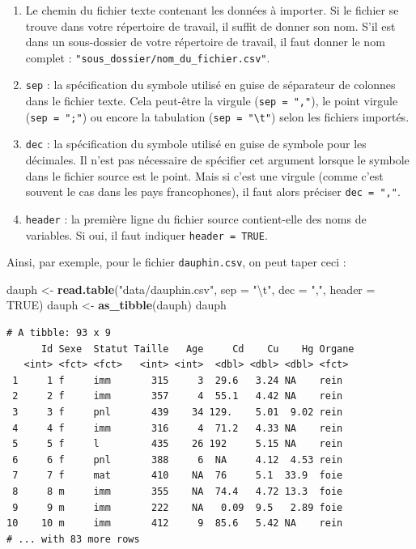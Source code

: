 \documentclass[a4paperpaper,]{article}
\newenvironment{Shaded}{\begin{snugshade}}{\end{snugshade}}
\newcommand{\CharTok}[1]{\textcolor[rgb]{0.57,0.30,0.62}{#1}}
\newcommand{\DataTypeTok}[1]{\textcolor[rgb]{0.00,0.34,0.68}{#1}}
\newcommand{\KeywordTok}[1]{\textcolor[rgb]{0.12,0.11,0.11}{\textbf{#1}}}
\newcommand{\NormalTok}[1]{\textcolor[rgb]{0.12,0.11,0.11}{#1}}
\newcommand{\OtherTok}[1]{\textcolor[rgb]{0.00,0.43,0.16}{#1}}
\newcommand{\StringTok}[1]{\textcolor[rgb]{0.75,0.01,0.01}{#1}}
\providecommand{\tightlist}{%
  \setlength{\itemsep}{0pt}\setlength{\parskip}{0pt}}
\begin{document}
\begin{enumerate}
\def\labelenumi{\arabic{enumi}.}
\tightlist
\item
  Le chemin du fichier texte contenant les données à importer. Si le fichier se trouve dans votre répertoire de travail, il suffit de donner son nom. S'il est dans un sous-dossier de votre répertoire de travail, il faut donner le nom complet : \texttt{"sous\_dossier/nom\_du\_fichier.csv"}.
\item
  \texttt{sep} : la spécification du symbole utilisé en guise de séparateur de colonnes dans le fichier texte. Cela peut-être la virgule (\texttt{sep\ =\ ","}), le point virgule (\texttt{sep\ =\ ";"}) ou encore la tabulation (\texttt{sep\ =\ "\textbackslash{}t"}) selon les fichiers importés.
\item
  \texttt{dec} : la spécification du symbole utilisé en guise de symbole pour les décimales. Il n'est pas nécessaire de spécifier cet argument lorsque le symbole dans le fichier source est le point. Mais si c'est une virgule (comme c'est souvent le cas dans les pays francophones), il faut alors préciser \texttt{dec\ =\ ","}.
\item
  \texttt{header} : la première ligne du fichier source contient-elle des noms de variables. Si oui, il faut indiquer \texttt{header\ =\ TRUE}.
\end{enumerate}

Ainsi, par exemple, pour le fichier \texttt{dauphin.csv}, on peut taper ceci :

\begin{Shaded}
\begin{Highlighting}[]
\NormalTok{dauph <-}\StringTok{ }\KeywordTok{read.table}\NormalTok{(}\StringTok{"data/dauphin.csv"}\NormalTok{, }\DataTypeTok{sep =} \StringTok{"}\CharTok{\textbackslash{}t}\StringTok{"}\NormalTok{, }\DataTypeTok{dec =} \StringTok{","}\NormalTok{, }\DataTypeTok{header =} \OtherTok{TRUE}\NormalTok{)}
\NormalTok{dauph <-}\StringTok{ }\KeywordTok{as_tibble}\NormalTok{(dauph)}
\NormalTok{dauph}
\end{Highlighting}
\end{Shaded}

\begin{verbatim}
# A tibble: 93 x 9
      Id Sexe  Statut Taille   Age     Cd    Cu    Hg Organe
   <int> <fct> <fct>   <int> <int>  <dbl> <dbl> <dbl> <fct> 
 1     1 f     imm       315     3  29.6   3.24 NA    rein  
 2     2 f     imm       357     4  55.1   4.42 NA    rein  
 3     3 f     pnl       439    34 129.    5.01  9.02 rein  
 4     4 f     imm       316     4  71.2   4.33 NA    rein  
 5     5 f     l         435    26 192     5.15 NA    rein  
 6     6 f     pnl       388     6  NA     4.12  4.53 rein  
 7     7 f     mat       410    NA  76     5.1  33.9  foie  
 8     8 m     imm       355    NA  74.4   4.72 13.3  foie  
 9     9 m     imm       222    NA   0.09  9.5   2.89 foie  
10    10 m     imm       412     9  85.6   5.42 NA    rein  
# ... with 83 more rows
\end{verbatim}
\end{document}
